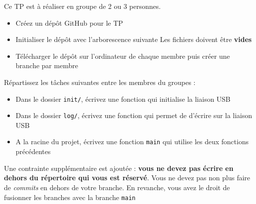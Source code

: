 \documentclass{beamer}
\newenvironment{FrameTP}{\begin{frame}[containsverbatim]{\secname}}{\end{frame}}
\begin{document}
\begin{FrameTP}
    Ce TP est à réaliser en groupe de 2 ou 3 personnes.
    \begin{itemize}
        \item Créez un dépôt GitHub pour le TP
        \item Initialiser le dépôt avec l'arborescence suivante
        \vspace{-1em}
        Les fichiers doivent être \textbf{vides}
        \item Télécharger le dépôt sur l'ordinateur de chaque membre puis créer une branche par membre
    \end{itemize}
\end{FrameTP}

\begin{FrameTP} 
    Répartissez les tâches suivantes entre les membres du groupes :
    \begin{itemize}
        \item Dans le dossier \texttt{init/}, écrivez une fonction qui initialise la liaison USB
        \item Dans le dossier \texttt{log/}, écrivez une fonction qui permet de d'écrire sur la liaison USB
        \item A la racine du projet, écrivez une fonction \verb|main| qui utilise les deux fonctions précédentes
    \end{itemize}
    Une contrainte supplémentaire est ajoutée : \textbf{vous ne devez pas écrire en dehors du répertoire qui vous est réservé}. Vous ne devez pas non plus faire de \textit{commits} en dehors de votre branche. En revanche, vous avez le droit de fusionner les branches avec la branche \texttt{main}
\end{FrameTP}
\end{document}
